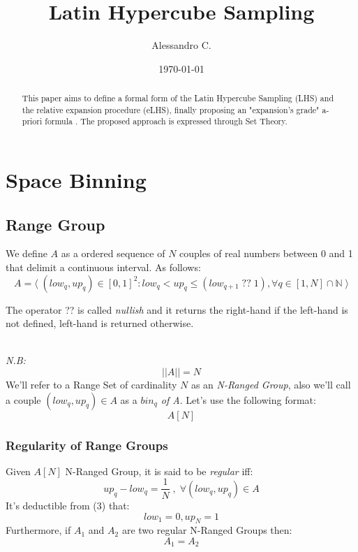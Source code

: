 \documentclass{article}
\begin{document}
\title{Latin Hypercube Sampling}
\author{Alessandro C.}
\date{\today}
\maketitle

\begin{abstract}
This paper aims to define a formal form of the Latin Hypercube Sampling (LHS) and the relative expansion procedure (eLHS), finally proposing an "expansion's grade" a-priori formula . The proposed approach is expressed through Set Theory.
\end{abstract}


\section{Space Binning}
\subsection{Range Group}
We define $A$ as a ordered sequence of $N$ couples of real numbers between 0 and 1 that delimit a continuous interval. As follows:
\begin{equation}
A = \langle\;(low_q, up_q) \in[0,1]^2 : low_q < up_q \leq (low_{q+1}\;??\;1), \forall q \in [1,N] \cap \mathbb{N}\;\rangle
\end{equation}
\begin{footnotesize}
The operator ?? is called \textit{nullish} and it returns the right-hand if the left-hand is not defined, left-hand is returned otherwise.
\end{footnotesize}
\\
\textit{N.B:}
\begin{equation}
|| A ||  = N
\end{equation}
We'll refer to a Range Set of cardinality $N$ as an \textit{N-Ranged Group}, also we'll call a couple $(low_q, up_q) \in A$ as a \textit{$bin_q$ of A}. Let's use the following format: 
\begin{equation*}
A[N]
\end{equation*}

\subsubsection{Regularity of Range Groups}
Given $A[N]$ N-Ranged Group, it is said to be \textit{regular} iff:
\begin{equation}
up_q - low_q = \frac{1}{N} \; , \; \forall (low_q, up_q) \in A
\end{equation}
It's deductible from (3) that:
\begin{equation*}
low_1 = 0 , up_N = 1
\end{equation*}
Furthermore, if $A_1$ and $A_2$ are two regular N-Ranged Groups then: 
\begin{equation}
A_1 = A_2
\end{equation}
\end{document}
